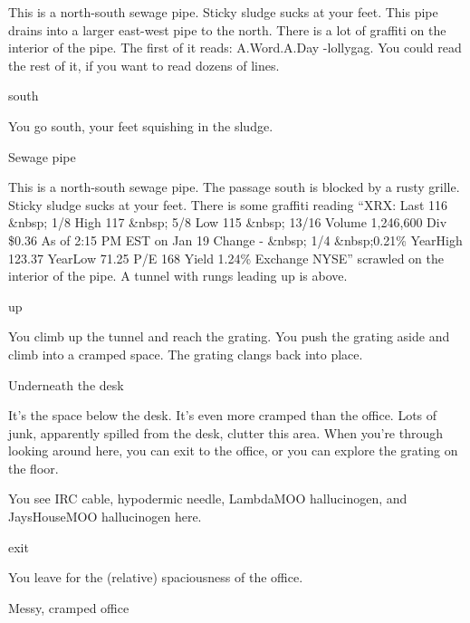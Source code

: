 \documentclass[10pt,twoside,openright]{memoir}
\begin{document}
{This is a north-south sewage pipe.  Sticky sludge sucks at your feet.  This
 pipe drains into a larger east-west pipe to the north.  There is a lot of
 graffiti on the interior of the pipe.  The first of it reads: A.Word.A.Day
 -lollygag.  You could read the rest of it, if you want to read dozens of
 lines.

south

You go south, your feet squishing in the sludge.

Sewage pipe

This is a north-south sewage pipe.  The passage south is blocked by a rusty
 grille.  Sticky sludge sucks at your feet.  There is some graffiti reading
 ``XRX: Last 116 \&nbsp; 1/8 High 117 \&nbsp; 5/8 Low 115 \&nbsp; 13/16 Volume
 1,246,600 Div \$0.36 As of  2:15 PM EST on Jan 19 Change - \&nbsp; 1/4
 \&nbsp;0.21\% YearHigh 123.37 YearLow 71.25 P/E 168 Yield 1.24\% Exchange NYSE''
 scrawled on the interior of the pipe.  A tunnel with rungs leading up is
 above.
 
up

You climb up the tunnel and reach the grating.  You push the grating aside and
 climb into a cramped space.  The grating clangs back into place.

Underneath the desk

It's the space below the desk.  It's even more cramped than the office.  Lots
 of junk, apparently spilled from the desk, clutter this area.  When you're
 through looking around here, you can exit to the office, or you can explore
 the grating on the floor.

You see IRC cable, hypodermic needle, LambdaMOO hallucinogen, and JaysHouseMOO hallucinogen here.

exit

You leave for the (relative) spaciousness of the office.

Messy, cramped office

}
\end{document}
